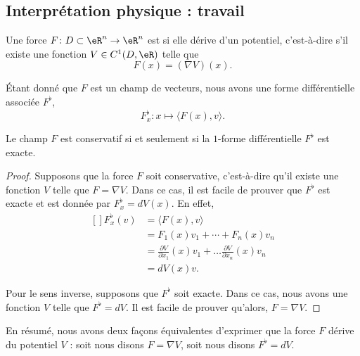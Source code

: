\subsection{Interprétation physique : travail}

\begin{definition}
	Une force $F\colon D\subset\eR^n\to \eR^n$ est  si elle dérive d'un potentiel, c'est-à-dire s'il existe une fonction $V\in C^1(D,\eR)$ telle que
	\begin{equation}
		F(x)=(\nabla V)(x).
	\end{equation}
\end{definition}
Étant donné que $F$ est un champ de vecteurs, nous avons une forme différentielle associée $F^{\flat}$,
\begin{equation}
	F^{\flat}_x\colon x\mapsto \langle F(x), v\rangle .
\end{equation}

\begin{lemma}
	Le champ $F$ est conservatif si et seulement si la $1$-forme différentielle $F^{\flat}$ est exacte.
\end{lemma}

\begin{proof}
	Supposons que la force $F$ soit conservative, c'est-à-dire qu'il existe une fonction $V$ telle que $F=\nabla V$. Dans ce cas, il est facile de prouver que $F^{\flat}$ est exacte et est donnée par $F_x^{\flat}=dV(x)$. En effet,
	\begin{equation}
		\begin{aligned}[]
			F_x^{\flat}(v)	&=\langle F(x), v\rangle \\
					&=F_1(x)v_1+\cdots+F_n(x)v_n\\
					&=\frac{ \partial V }{ \partial x_1 }(x)v_1+\ldots\frac{ \partial V }{ \partial x_n }(x)v_n\\
					&=dV(x)v.
		\end{aligned}
	\end{equation}

	Pour le sens inverse, supposons que $F^{\flat}$ soit exacte. Dans ce cas, nous avons une fonction $V$ telle que $F^{\flat}=dV$. Il est facile de prouver qu'alors, $F=\nabla V$.
\end{proof}
En résumé, nous avons deux façons équivalentes d'exprimer que la force $F$ dérive du potentiel $V$ :  soit nous disons $F=\nabla V$, soit nous disons $F^{\flat}=dV$.

